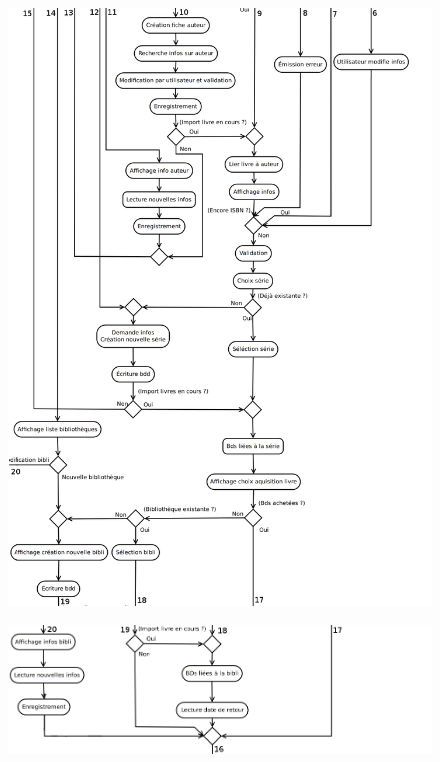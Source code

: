 \begin{figure}[h!]
\begin{center}
\includegraphics[width=16cm]{uml/appli_pc/p3.png}
\end{center}
\end{figure}
\newpage{}

\begin{figure}[t!]
\begin{center}
\includegraphics[width=16cm]{uml/appli_pc/p4.png}
\end{center}
\end{figure}


